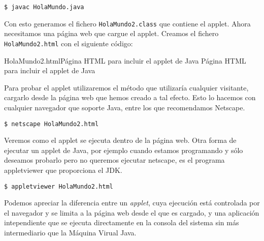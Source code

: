 \begin{verbatim}
$ javac HolaMundo.java
\end{verbatim}

Con esto generamos  el fichero {\tt HolaMundo2.class}  que contiene el
applet. Ahora necesitamos una página  web que cargue el applet. Creamos
el fichero {\tt HolaMundo2.html} con el siguiente código:

\begin{ejemplo}{HolaMundo2.html}{Página HTML para incluir el applet de Java}
Página HTML para incluir el applet de Java
\end{ejemplo}

Para probar el applet utilizaremos  el método que utilizaría cualquier
visitante, cargarlo desde la página web que hemos creado a tal efecto.
Esto lo  hacemos con cualquier  navegador que soporte Java,  entre los
que recomendamos Netscape.

\begin{verbatim}
$ netscape HolaMundo2.html
\end{verbatim}

Veremos como el applet se ejecuta  dentro de la página web. Otra forma
de ejecutar un applet de  Java, por ejemplo cuando estamos programando
y sólo  deseamos probarlo  pero no queremos  ejecutar netscape,  es el
programa appletviewer que proporciona el JDK.

\begin{verbatim}
$ appletviewer HolaMundo2.html
\end{verbatim}

Podemos apreciar la  diferencia entre un {\em  applet}, cuya ejecución
está controlada por el navegador y se  limita a la página web desde el
que  es  cargado,  y  una  aplicación  intependiente  que  se  ejecuta
directamente en  la consola del  sistema sin más intermediario  que la
Máquina Virual Java.

